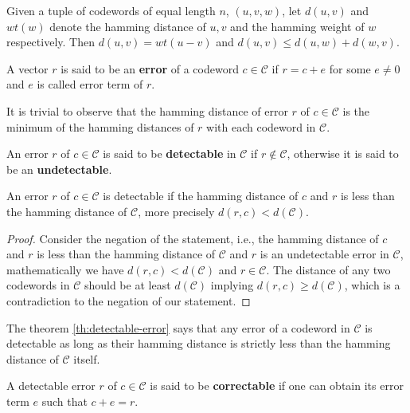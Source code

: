 \begin{lemma}\cite{../gallian2024contemporary}\label{lem:distance}
  Given a tuple of codewords of equal length $n$, $(u, v, w)$, let $d(u,v)$ and $wt(w)$ denote the hamming 
  distance of $u, v$ and the hamming weight of $w$ respectively. Then $d(u,v) = wt(u-v)$ and 
  $d(u,v)\leq d(u,w)+d(w,v)$.
\end{lemma}

\begin{definition}[error]
  A vector $r$ is said to be an \textbf{error} of a codeword $c\in\mathcal{C}$ if 
  $r=c+e$ for some $e\neq 0$ and $e$ is called error term of $r$.
\end{definition}

It is trivial to observe that the hamming distance of error $r$ of $c\in\mathcal{C}$ is the minimum of the 
hamming distances of $r$ with each codeword in $\mathcal{C}$.

\begin{definition}
  An error $r$ of $c\in\mathcal{C}$ is said to be \textbf{detectable} in $\mathcal{C}$ if 
  $r\notin\mathcal{C}$, otherwise it is said to be an \textbf{undetectable}.
\end{definition}

\begin{theorem}\cite{../gallian2024contemporary}\label{th:detectable-error}
  An error $r$ of $c\in\mathcal{C}$ is detectable if the hamming distance of $c$ 
  and $r$ is less than the hamming distance of $\mathcal{C}$, more precisely 
  $d(r,c)<d(\mathcal{C})$.
\end{theorem}
\begin{proof}
  Consider the negation of the statement, i.e., the hamming distance of $c$ and $r$ is less than 
  the hamming distance of $\mathcal{C}$ and $r$ is an undetectable error in $\mathcal{C}$, mathematically 
  we have $d(r,c)<d(\mathcal{C})$ and $r\in\mathcal{C}$. The distance of any two codewords in 
  $\mathcal{C}$ should be at least $d(\mathcal{C})$ implying $d(r,c)\geq d(\mathcal{C})$, which is a 
  contradiction to the negation of our statement.
\end{proof}

The theorem \ref{th:detectable-error} says that any error of a codeword in $\mathcal{C}$ is 
detectable as long as their hamming distance is strictly less than the hamming distance of
$\mathcal{C}$ itself.

\begin{definition}
  A detectable error $r$ of $c\in\mathcal{C}$ is said to be \textbf{correctable} if one can obtain its 
  error term $e$ such that $c+e=r$.
\end{definition}

